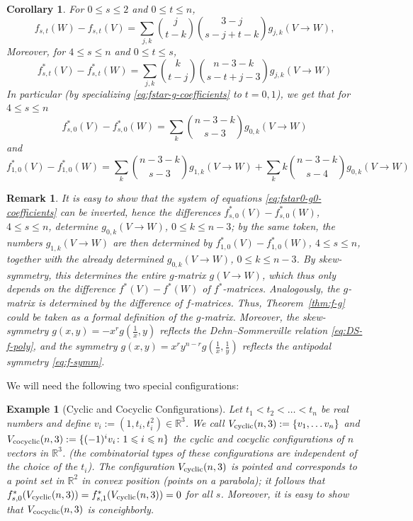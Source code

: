 \documentclass[11pt]{article}
\newtheorem{corollary}[theorem]{Corollary}
\newtheorem{remark}[theorem]{Remark}
\newtheorem{example}[theorem]{Example}
\renewcommand{\leq}{\leqslant}
\newcommand{\R}{\mathbb{R}}
\newcommand{\cyclic}{V_{\textup{cyclic}}}
\newcommand{\cocyclic}{V_{\textup{cocyclic}}}
\begin{document}
\begin{corollary} 
\label{cor:f-g-fstar-gstar-coefficients}
For $0\leq s\leq 2$ and $0\leq t\leq n$,
\begin{equation}
\label{eq:f-g-coefficients}
f_{s,t}(W)-f_{s,t}(V) = \sum_{j,k} \binom{j}{t-k}\binom{3-j}{s-j+t-k} g_{j,k}(V\to W),
\end{equation}
Moreover, for $4\leq s \leq n$ and $0\leq t \leq s$,
\begin{equation}
\label{eq:fstar-g-coefficients}
f^*_{s,t}(V)-f^*_{s,t}(W) = \sum_{j,k} \binom{k}{t-j}\binom{n-3-k}{s-t+j-3}g_{j,k}(V\to W)
\end{equation}
In particular (by specializing \eqref{eq:fstar-g-coefficients} to $t=0,1$), we get that for $4\leq s \leq n$
\begin{equation}
\label{eq:fstar0-g0-coefficients}
f^*_{s,0}(V)-f^*_{s,0}(W) = \sum_{k} \binom{n-3-k}{s-3}g_{0,k}(V\to W)
\end{equation}
and
\begin{equation}
\label{eq:fstar-g1-coefficients}
\textstyle f^*_{1,0}(V)-f^*_{1,0}(W) = \sum_{k} \binom{n-3-k}{s-3}g_{1,k}(V\to W) + \sum_{k}k\binom{n-3-k}{s-4}g_{0,k}(V\to W)
\end{equation}
\end{corollary}
\begin{remark} 
\label{rem:g-f+DS-g}
It is easy to show that the system of equations \eqref{eq:fstar0-g0-coefficients} can be inverted, hence the differences $f^*_{s,0}(V)-f^*_{s,0}(W)$, $4\leq s\leq n$, determine $g_{0,k}(V\to W)$, $0\leq k\leq n-3$; by the same token, the numbers $g_{1,k}(V\to W)$ are then determined by $f^*_{1,0}(V)-f^*_{1,0}(W)$, $4\leq s\leq n$, together with the already determined $g_{0,k}(V\to W)$, $0\leq k\leq n-3$. By skew-symmetry, this determines the entire $g$-matrix $g(V\to W)$, which thus only depends on the difference $f^*(V)-f^*(W)$ of $f^*$-matrices. Analogously, the $g$-matrix is determined by the difference of $f$-matrices. Thus, Theorem~\ref{thm:f-g} could be taken as a formal definition of the $g$-matrix.
Moreover, the skew-symmetry $g(x,y)=-x^r g(\frac{1}{x},y)$ reflects the Dehn--Sommerville relation \eqref{eq:DS-f-poly}, and the symmetry $g(x,y)=x^ry^{n-r}g(\frac{1}{x},\frac{1}{y})$ reflects the antipodal symmetry \eqref{eq:f-symm}.
\end{remark}
%
We will need the following two special configurations: 
\begin{example}[{Cyclic and Cocyclic Configurations}]
\label{ex:cyclic-cocyclic}
Let $t_1<t_2<\dots<t_n$ be real numbers and define $v_i:= (1,t_i,t_i^2) \in \R^3$. We call $\cyclic(n,3):=\{v_1,\dots v_n\}$ and $\cocyclic(n,3):=\{(-1)^i v_i\colon 1\leq i\leq n\}$ the \emph{cyclic} and \emph{cocyclic} configurations of $n$ vectors in $\R^3$.
 (the combinatorial types of these configurations are independent of the choice of the $t_i$). 
 The configuration $\cyclic(n,3)$ is pointed and corresponds to a point set in $\R^2$ in convex position (points on a parabola); it follows that $f^*_{s,0}(\cyclic(n,3))=f^*_{s,1}(\cyclic(n,3))=0$ for all $s$. Moreover, it is easy to show \cite[Lemma~3.5.1]{Matousek:2003aa} that 
$\cocyclic(n,3)$ is coneighborly.
\end{example}
\end{document}
